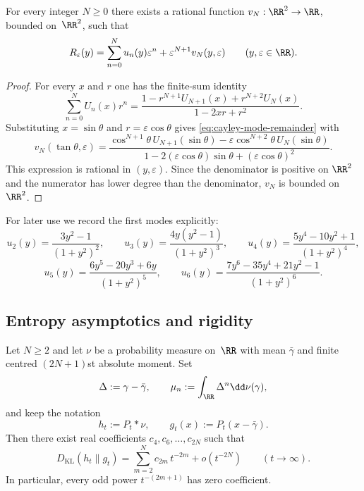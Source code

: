 \begin{proposition}%
\label{prop:cayley-mode-remainder}
For every integer $N\ge 0$ there exists a rational function
$v_N:\RR^2\to\RR$, bounded on~$\RR^2$, such that
\begin{equation}\label{eq:cayley-mode-remainder}
R_\varepsilon(y)
=\sum_{n=0}^{N}u_n(y)\varepsilon^n+\varepsilon^{N+1}v_N(y,\varepsilon)
\qquad(y,\varepsilon\in\RR).
\end{equation}
\end{proposition}

\begin{proof}
For every $x$ and $r$ one has the finite-sum identity
\[
\sum_{n=0}^{N}U_n(x)r^n
=\frac{1-r^{N+1}U_{N+1}(x)+r^{N+2}U_N(x)}{1-2xr+r^2}.
\]
Substituting $x=\sin\theta$ and $r=\varepsilon\cos\theta$ gives
\eqref{eq:cayley-mode-remainder} with
\[
v_N(\tan\theta,\varepsilon)
=\frac{\cos^{N+1}\theta\,U_{N+1}(\sin\theta)
-\varepsilon\cos^{N+2}\theta\,U_N(\sin\theta)}
{1-2(\varepsilon\cos\theta)\sin\theta+(\varepsilon\cos\theta)^2}.
\]
This expression is rational in $(y,\varepsilon)$.  Since the denominator
is positive on $\RR^2$ and the numerator has lower degree than the
denominator, $v_N$ is bounded on~$\RR^2$.
\end{proof}

For later use we record the first modes explicitly:
\begin{equation}\label{eq:cayley-first-modes}
u_2(y)=\frac{3y^2-1}{(1+y^2)^2},
\qquad
u_3(y)=\frac{4y(y^2-1)}{(1+y^2)^3},
\qquad
u_4(y)=\frac{5y^4-10y^2+1}{(1+y^2)^4},
\end{equation}
\begin{equation}\label{eq:cayley-next-modes}
u_5(y)=\frac{6y^5-20y^3+6y}{(1+y^2)^5},
\qquad
u_6(y)=\frac{7y^6-35y^4+21y^2-1}{(1+y^2)^6}.
\end{equation}

\subsection{Entropy asymptotics and rigidity}

\begin{theorem}%
\label{thm:poisson-kl-even-orders}
Let $N\ge 2$ and let $\nu$ be a probability measure on~$\RR$ with mean
$\bar\gamma$ and finite centred $(2N+1)$st absolute moment.  Set
\[
\Delta:=\gamma-\bar\gamma,
\qquad
\mu_n:=\int_{\RR}\Delta^n\dd\nu(\gamma),
\]
and keep the notation
\[
h_t:=P_t*\nu,
\qquad
g_t(x):=P_t(x-\bar\gamma).
\]
Then there exist real coefficients $c_4,c_6,\dots,c_{2N}$ such that
\begin{equation}\label{eq:poisson-kl-even-orders}
D_{\mathrm{KL}}(h_t\|g_t)
=\sum_{m=2}^{N}c_{2m}\,t^{-2m}+o(t^{-2N})
\qquad(t\to\infty).
\end{equation}
In particular, every odd power $t^{-(2m+1)}$ has zero coefficient.
\end{theorem}

